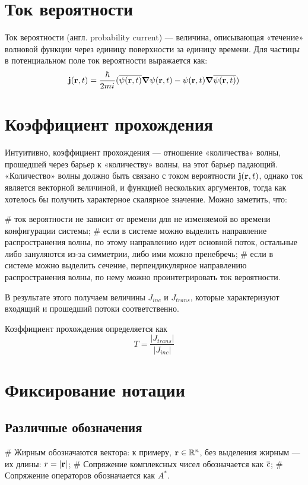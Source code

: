 \section{Ток вероятности}
Ток вероятности (англ. probability current) — величина, описывающая «течение» волновой функции через единицу поверхности за единицу времени. Для частицы в потенциальном поле ток вероятности выражается как:
\[
\vb{j}(\vb{r}, t) = \frac{\hbar}{2 m {i\mkern1mu}} (\overline{\psi(\vb{r}, t)} \grad{\psi(\vb{r}, t)} - \psi(\vb{r}, t) \grad{\overline{\psi(\vb{r}, t)})}
\]

\section{Коэффициент прохождения}
Интуитивно, коэффициент прохождения — отношение «количества» волны, прошедшей через барьер к «количеству» волны, на этот барьер падающий. «Количество» волны должно быть связано с током вероятности $\vb{j}(\vb{r}, t)$, однако ток является векторной величиной, и функцией нескольких аргументов, тогда как хотелось бы получить характерное скалярное значение. Можно заметить, что:

\begin{easylist}[itemize]
# ток вероятности не зависит от времени для не изменяемой во времени конфигурации системы;
# если в системе можно выделить направление распространения волны, по этому направлению идет основной поток, остальные либо зануляются из-за симметрии, либо ими можно пренебречь;
# если в системе можно выделить сечение, перпендикулярное направлению распространения волны, по нему можно проинтегрировать ток вероятности.
\end{easylist}

В результате этого получаем величины $J_{inc}$ и $J_{trans}$, которые характеризуют входящий и прошедший потоки соответственно. 

Коэффициент прохождения определяется как
\[
T = \frac{|J_{trans}|}{|J_{inc}|}
\]

\section{Фиксирование нотации}
\subsection{Различные обозначения}

\begin{ilist}
# Жирным обозначаются вектора: к примеру, $\vb{r} \in \mathbb{R}^n$, без выделения жирным — их длины: $r = |\vb{r}|$;
# Сопряжение комплексных чисел обозначается как $\overline{c}$;
# Сопряжение операторов обозначается как $A^*$.
\end{ilist}


